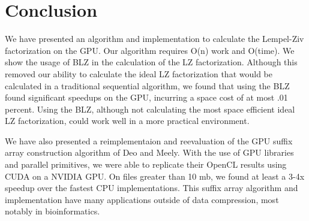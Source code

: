 \chapter{Conclusion}
\label{chap:conclusion}

We have presented an algorithm and implementation to calculate the Lempel-Ziv factorization on the GPU.
Our algorithm requires O(n) work and O(time).
We show the usage of BLZ in the calculation of the LZ factorization.
Although this removed our ability to calculate the ideal LZ factorization that would be calculated in a traditional sequential algorithm, we found that using the BLZ found significant speedups on the GPU, incurring a space cost of at most .01 percent.
Using the BLZ, although not calculating the most space efficient ideal LZ factorization, could work well in a more practical environment.

We have also presented a reimplementaion and reevaluation of the GPU suffix array construction algorithm of Deo and Meely\cite{Deo}.
With the use of GPU libraries and parallel primitives, we were able to replicate their OpenCL results using CUDA on a NVIDIA GPU.
On files greater than 10 mb, we found at least a 3-4x speedup over the fastest CPU implementations.
This suffix array algorithm and implementation have many applications outside of data compression, most notably in bioinformatics.
